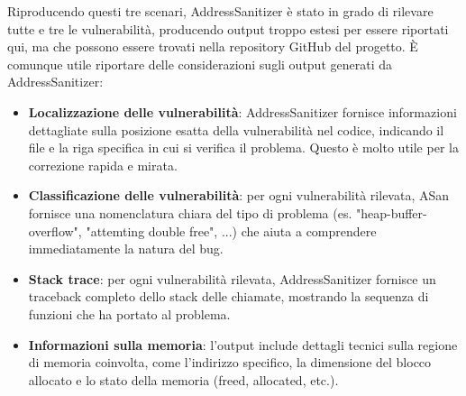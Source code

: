 \noindent
Riproducendo questi tre scenari, AddressSanitizer è stato in grado di rilevare
tutte e tre le vulnerabilità, producendo output troppo estesi per essere riportati
qui, ma che possono essere trovati nella repository GitHub del progetto. È comunque
utile riportare delle considerazioni sugli output generati da AddressSanitizer:
\begin{itemize}
  \item \textbf{Localizzazione delle vulnerabilità}: AddressSanitizer fornisce informazioni
    dettagliate sulla posizione esatta della vulnerabilità nel codice, indicando
    il file e la riga specifica in cui si verifica il problema. Questo è molto utile
    per la correzione rapida e mirata.

  \item \textbf{Classificazione delle vulnerabilità}: per ogni vulnerabilità rilevata,
    ASan fornisce una nomenclatura chiara del tipo di problema (es. "heap-buffer-overflow",
    "attemting double free", ...) che aiuta a comprendere immediatamente la natura
    del bug.

  \item \textbf{Stack trace}: per ogni vulnerabilità rilevata, AddressSanitizer
    fornisce un traceback completo dello stack delle chiamate, mostrando la sequenza
    di funzioni che ha portato al problema.

  \item \textbf{Informazioni sulla memoria}: l'output include dettagli tecnici sulla
    regione di memoria coinvolta, come l'indirizzo specifico, la dimensione del blocco
    allocato e lo stato della memoria (freed, allocated, etc.).
\end{itemize}